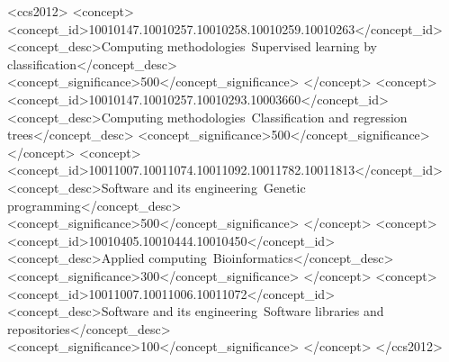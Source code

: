 \documentclass[dvipsnames,format=sigconf,anonymous=false,review=false]{acmart}
\begin{document}
  
  

\begin{CCSXML}
  <ccs2012>
  <concept>
      <concept_id>10010147.10010257.10010258.10010259.10010263</concept_id>
      <concept_desc>Computing methodologies~Supervised learning by classification</concept_desc>
      <concept_significance>500</concept_significance>
      </concept>
  <concept>
      <concept_id>10010147.10010257.10010293.10003660</concept_id>
      <concept_desc>Computing methodologies~Classification and regression trees</concept_desc>
      <concept_significance>500</concept_significance>
      </concept>
  <concept>
      <concept_id>10011007.10011074.10011092.10011782.10011813</concept_id>
      <concept_desc>Software and its engineering~Genetic programming</concept_desc>
      <concept_significance>500</concept_significance>
      </concept>
  <concept>
      <concept_id>10010405.10010444.10010450</concept_id>
      <concept_desc>Applied computing~Bioinformatics</concept_desc>
      <concept_significance>300</concept_significance>
      </concept>
  <concept>
      <concept_id>10011007.10011006.10011072</concept_id>
      <concept_desc>Software and its engineering~Software libraries and repositories</concept_desc>
      <concept_significance>100</concept_significance>
      </concept>
</ccs2012>
\end{CCSXML}




\maketitle
\end{document}
